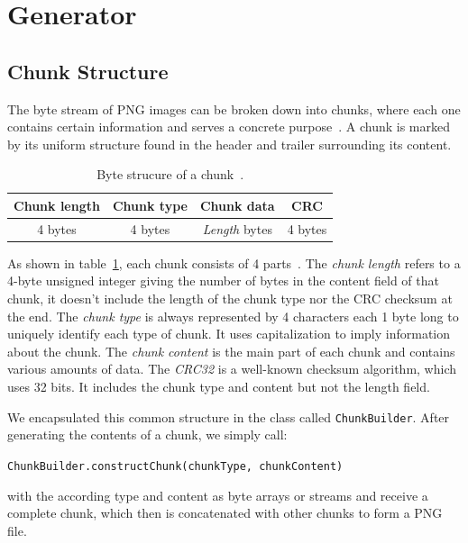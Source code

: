 \documentclass[runningheads]{llncs}
\begin{document}
\section{Generator}
\subsection{Chunk Structure}
\label{chunk_structure}
The byte stream of PNG images can be broken down into chunks, where each one contains certain information and serves a concrete purpose~\cite{libpng_chunks}. A chunk is marked by its uniform structure found in the header and trailer surrounding its content.
\bgroup
\def\arraystretch{1.5}
\setlength\tabcolsep{1.5ex}
    \begin{table}
        \caption{Byte strucure of a chunk~\cite{libpng_file_structure}.}
        \label{tab1}
        \begin{center}
            \begin{tabular}{|c|c|c|c|}
                \hline 
                \textbf{Chunk length} & \textbf{Chunk type} & \textbf{Chunk data} & \textbf{CRC} \\
                \hline \hline
                4 bytes               & 4 bytes             & \textit{Length} bytes        & 4 bytes \\
                \hline
            \end{tabular}              
        \end{center}
    \end{table}
\egroup

As shown in table~\ref{tab1}, each chunk consists of 4 parts~\cite{libpng_file_structure}. 
The \textit{chunk length} refers to a 4-byte unsigned integer giving the number of bytes in the content field of that chunk, it doesn't include the length of the chunk type nor the CRC checksum at the end.
The \textit{chunk type} is always represented by 4 characters each 1 byte long to uniquely identify each type of chunk. It uses capitalization to imply information about the chunk.
The \textit{chunk content} is the main part of each chunk and contains various amounts of data.
The \textit{CRC32} is a well-known checksum algorithm, which uses 32 bits. It includes the chunk type and content but not the length field.

We encapsulated this common structure in the class called \texttt{ChunkBuilder}. After generating the contents of a chunk, we simply call: 
\begin{center}
\texttt{ChunkBuilder.constructChunk(chunkType, chunkContent)} 
\end{center}
with the according type and content as byte arrays or streams and receive a complete chunk, which then is concatenated with other chunks to form a PNG file. 
\end{document}
